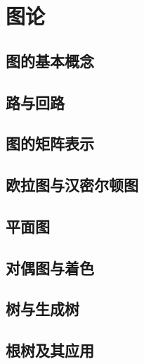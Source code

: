 \section{图论}

\subsection{图的基本概念}

\subsection{路与回路}

\subsection{图的矩阵表示}

\subsection{欧拉图与汉密尔顿图}

\subsection{平面图}

\subsection{对偶图与着色}

\subsection{树与生成树}

\subsection{根树及其应用}